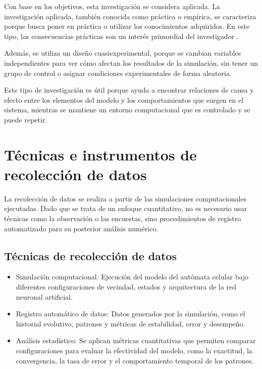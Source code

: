 Con base en los objetivos, esta investigación se considera aplicada. La investigación aplicada, también conocida como práctica o empírica, se caracteriza porque busca poner en práctica o utilizar los conocimientos adquiridos. En este tipo, las consecuencias prácticas son un interés primordial del investigador \cite{veracruz_aplicada}.

Además, se utiliza un diseño cuasiexperimental, porque se cambian variables independientes para ver cómo afectan los resultados de la simulación, sin tener un grupo de control o asignar condiciones experimentales de forma aleatoria. 

Este tipo de investigación es útil porque ayuda a encontrar relaciones de causa y efecto entre los elementos del modelo y los comportamientos que surgen en el sistema, mientras se mantiene un entorno computacional que es controlado y se puede repetir.

\section{Técnicas e instrumentos de recolección de datos}

La recolección de datos se realiza a partir de las simulaciones computacionales ejecutadas. Dado que se trata de un enfoque cuantitativo, no es necesario usar técnicas como la observación o las encuestas, sino procedimientos de registro automatizado para su posterior análisis numérico. 

\subsection{Técnicas de recolección de datos}

\begin{itemize}
	
	\item Simulación computacional: Ejecución del modelo del autómata celular bajo diferentes configuraciones de vecindad, estados y arquitectura de la red neuronal artificial.
	
	\item Registro automático de datos: Datos generados por la simulación, como el historial evolutivo, patrones y métricas de estabilidad, error y desempeño.
	
	\item Análisis estadístico: Se aplican métricas cuantitativas que permiten comparar configuraciones para evaluar la efectividad del modelo, como la exactitud, la convergencia, la tasa de error y el comportamiento temporal de los patrones.
	
\end{itemize}

